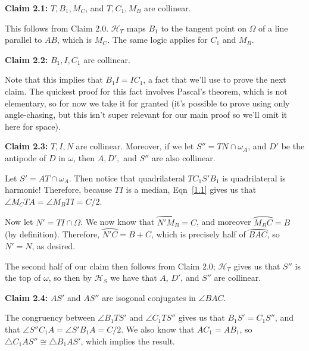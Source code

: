 \begin{theorem}
\textbf{Claim 2.1:} $T, B_1, M_C$, and $T, C_1, M_B$ are collinear.
\end{theorem}\V

This follows from Claim 2.0. $\mathcal{H}_T$ maps $B_1$ to the tangent point on $\Omega$ of a line parallel to $AB$, which is $M_C$. The same logic applies for $C_1$ and $M_B$.\V

\begin{theorem}
\textbf{Claim 2.2:} $B_1, I, C_1$ are collinear.
\end{theorem}\V

Note that this implies that $B_1I = IC_1$, a fact that we'll use to prove the next claim. The quickest proof for this fact involves Pascal's theorem, which is not elementary, so for now we take it for granted (it's possible to prove using only angle-chasing, but this isn't super relevant for our main proof so we'll omit it here for space).\V

\begin{theorem}
\textbf{Claim 2.3:} $T, I, N$ are collinear. Moreover, if we let $S'' = TN\cap \omega_A$, and $D'$ be the antipode of $D$ in $\omega$, then $A, D',$ and $S''$ are also collinear.
\end{theorem}\V

Let $S' = AT\cap \omega_A$. Then notice that quadrilateral $TC_1S'B_1$ is quadrilateral is harmonic! Therefore, because $TI$ is a median, Eqn~\ref{1.1} gives us that $\angle{M_CTA} = \angle{M_BTI} = C/2$.\V

Now let $N' = TI\cap \Omega$. We now know that $\wideparen{N'M_B} = C$, and moreover $\wideparen{M_BC} = B$ (by definition). Therefore, $\wideparen{N'C} = B+C$, which is precisely half of $\wideparen{BAC}$, so $N' = N$, as desired.\V

The second half of our claim then follows from Claim 2.0; $\mathcal{H}_T$ gives us that $S''$ is the top of $\omega$, so then by $\mathcal{H}_S$ we have that $A$, $D'$, and $S''$ are collinear.\V

\begin{theorem}
\textbf{Claim 2.4:} $AS'$ and $AS''$ are isogonal conjugates in $\angle{BAC}$.
\end{theorem}\V

The congruency between $\angle{B_1TS'}$ and $\angle{C_1TS''}$ gives us that $B_1S' = C_1S''$, and that $\angle{S''C_1A} = \angle{S'B_1A} = C/2$. We also know that $AC_1=AB_1$, so $\triangle{C_1AS''}\cong \triangle{B_1AS'}$, which implies the result.

